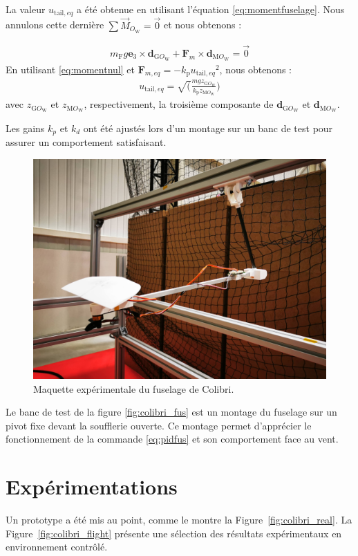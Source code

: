 {\color{blue} La valeur $u_{\text{tail},eq}$ a été obtenue en utilisant l'équation \eqref{eq:momentfuselage}. Nous annulons cette dernière $\sum \overrightarrow{M}_{O_{\text{W}}} = \overrightarrow{0}$  et nous obtenons :

\begin{align}
    \label{eq:momentnul}
    m_{\text{F}} g \boldsymbol{e}_3 \times \boldsymbol{d}_{\text{G}O_{\text{W}}} + \boldsymbol{F}_{m} \times \boldsymbol{d}_{\text{M}O_{\text{W}}} = \overrightarrow{0}
\end{align}
En utilisant \eqref{eq:momentnul} et $\boldsymbol{F}_{m,eq} = - k_{\text{p}} {u_{\text{tail},eq}}^{2}$, nous obtenons :
\begin{align}
    u_{\text{tail},eq} = \sqrt(\frac{mg {z}_{\text{G}O_{\text{W}}} }{k_{\text{p}} {z}_{\text{M}O_{\text{W}}} })
\end{align}
avec ${z}_{\text{G}O_{\text{W}}}$ et ${z}_{\text{M}O_{\text{W}}}$, respectivement, la troisième composante de $\boldsymbol{d}_{\text{G}O_{\text{W}}} $ et $\boldsymbol{d}_{\text{M}O_{\text{W}}}$.

Les gains $k_{p}$ et $k_{d}$ ont été ajustés lors d'un montage sur un banc de test pour assurer un comportement satisfaisant. 
\begin{figure}[ht!]
    \centering
    \includegraphics[trim={0 15cm 0 25cm},clip, width=0.6\columnwidth]{figures/IMG_20230120_141852.jpg}
    \caption{Maquette expérimentale du fuselage de Colibri.}
    \label{fig:colibri_fus}
\end{figure}
Le banc de test de la figure \eqref{fig:colibri_fus} est un montage du fuselage sur un pivot fixe devant la soufflerie ouverte. Ce montage permet d'apprécier le fonctionnement de la commande \eqref{eq:pidfus} et son comportement face au vent.
}



\section{Expérimentations}
\label{sec:exp}
Un prototype a été mis au point, comme le montre la Figure~\ref{fig:colibri_real}. La Figure~\ref{fig:colibri_flight} présente une sélection des résultats expérimentaux en environnement contrôlé.


